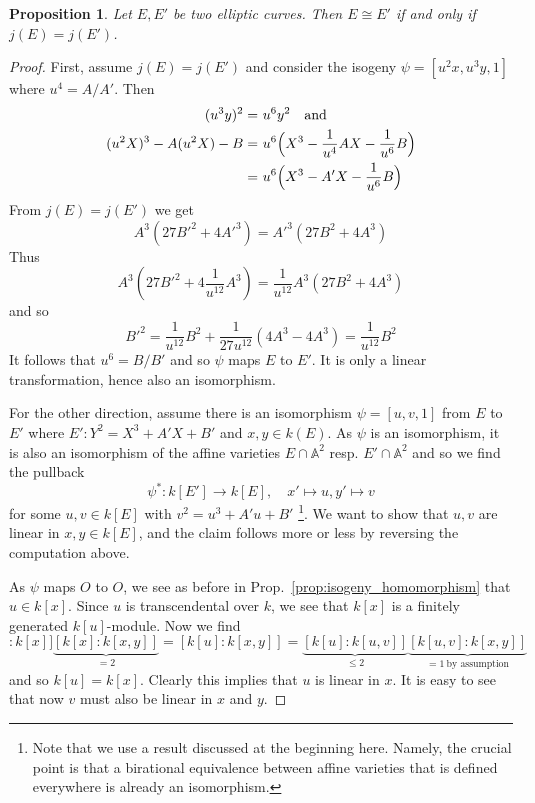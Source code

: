 \documentclass{scrartcl}
\newcommand{\Aff}{\mathbb{A}}
\renewcommand{\O}{O}
\newtheorem{prop}{Proposition}[section]
\theoremstyle{definition}
\begin{document}
\begin{prop}
    Let $E, E'$ be two elliptic curves. Then $E \cong E'$ if and only if $j(E) = j(E')$.
\end{prop}
\begin{proof}
    First, assume $j(E) = j(E')$ and consider the isogeny $\psi = [u^2 x, u^3 y, 1]$ where $u^4 = A/A'$.
    Then
    \begin{align*}
        (u^3 y)^2 =& \ u^6 y^2 \quad \text{and} \\
        (u^2 X)^3 - A (u^2 X) - B =& \ u^6 \Bigl(X^3 - \frac 1 {u^4} A X - \frac 1 {u^6} B \Bigr) \\
        =& \ u^6 \Bigl( X^3 - A' X - \frac 1 {u^6} B \Bigr)
    \end{align*}
    From $j(E) = j(E')$ we get
    \begin{equation*}
        A^3 (27 B'^2 + 4A'^3) = A'^3 (27 B^2 + 4A^3)
    \end{equation*}
    Thus
    \begin{equation*}
        A^3 \left( 27 B'^2 + 4\frac 1 {u^{12}} A^3 \right) = \frac 1 {u^{12}} A^3 (27 B^2 + 4A^3)
    \end{equation*}
    and so
    \begin{equation*}
        B'^2 = \frac 1 {u^{12}} B^2 + \frac 1 {27 u^{12}} (4 A^3 - 4 A^3) = \frac 1 {u^{12}} B^2
    \end{equation*}
    It follows that $u^6 = B/B'$ and so $\psi$ maps $E$ to $E'$. 
    It is only a linear transformation, hence also an isomorphism.

    For the other direction, assume there is an isomorphism $\psi = [u, v, 1]$ from $E$ to $E'$ where $E': Y^2 = X^3 + A'X + B'$ and $x, y \in k(E)$.
    As $\psi$ is an isomorphism, it is also an isomorphism of the affine varieties $E \cap \Aff^2$ resp. $E' \cap \Aff^2$ and so we find the pullback
    \begin{equation*}
        \psi^*: k[E'] \to k[E], \quad x' \mapsto u, y' \mapsto v
    \end{equation*}
    for some $u, v \in k[E]$ with $v^2 = u^3 + A'u + B'$
    \footnote{Note that we use a result discussed at the beginning here.
    Namely, the crucial point is that a birational equivalence between affine varieties that is defined everywhere is already an isomorphism.}.
    We want to show that $u, v$ are linear in $x, y \in k[E]$, and the claim follows more or less by reversing the computation above.

    As $\psi$ maps $\O$ to $\O$, we see as before in Prop.~\ref{prop:isogeny_homomorphism} that $u \in k[x]$.
    Since $u$ is transcendental over $k$, we see that $k[x]$ is a finitely generated $k[u]$-module.
    Now we find
    \begin{equation*}
        [k[u] : k[x]] \underbrace{[k[x] : k[x, y]]}_{= 2} = [k[u] : k[x, y]] = \underbrace{[k[u] : k[u, v]]}_{\leq 2} \underbrace{[k[u, v] : k[x, y]]}_{= 1 \ \text{by assumption}}
    \end{equation*}
    and so $k[u] = k[x]$.
    Clearly this implies that $u$ is linear in $x$.
    It is easy to see that now $v$ must also be linear in $x$ and $y$.
\end{proof}
\end{document}
